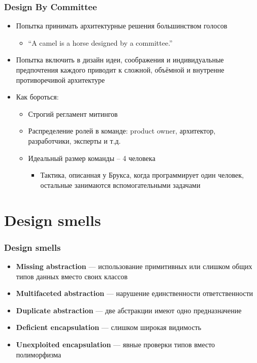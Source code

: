 \documentclass[xetex,mathserif,serif]{beamer}
\begin{document}
	\begin{frame}
		\frametitle{Design By Committee}
		\begin{itemize}
			\item Попытка принимать архитектурные решения большинством голосов
			\begin{itemize}
				\item ``A camel is a horse designed by a committee.''
			\end{itemize}
			\item Попытка включить в дизайн идеи, соображения и индивидуальные предпочтения каждого приводит к сложной, объёмной и внутренне противоречивой архитектуре
			\item Как бороться:
			\begin{itemize}
				\item Строгий регламент митингов
				\item Распределение ролей в команде: product owner, архитектор, разработчики, эксперты и т.д.
				\item Идеальный размер команды – 4 человека
				\begin{itemize}
					\item Тактика, описанная у Брукса, когда программирует один человек, остальные занимаются вспомогательными задачами
				\end{itemize}
			\end{itemize}
		\end{itemize}
	\end{frame}

	\section{Design smells}

	\begin{frame}
		\frametitle{Design smells}
		\begin{itemize}
			\item \textbf{Missing abstraction} --- использование примитивных или слишком общих типов данных вместо своих классов
			\item \textbf{Multifaceted abstraction} --- нарушение единственности ответственности
			\item \textbf{Duplicate abstraction} --- две абстракции имеют одно предназначение
			\item \textbf{Deficient encapsulation} --- слишком широкая видимость
			\item \textbf{Unexploited encapsulation} --- явные проверки типов вместо полиморфизма
		\end{itemize}
	\end{frame}
\end{document}
